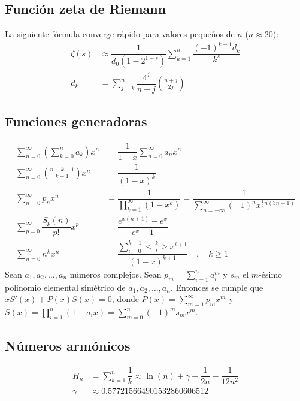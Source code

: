 \documentclass[11pt]{article}
\newcommand{\genEuler}[3]{%
	\genfrac{<}{>}{0pt}{#1}{#2}{#3}%
}
\newcommand{\euler}[2]{\genEuler{}{#1}{#2}}
\begin{document}
		\subsection{Función zeta de Riemann}
			La siguiente fórmula converge rápido para valores pequeños de $n$ ($n \approx 20$):
			\begin{align*}
				\zeta(s) &\approx \dfrac{1}{d_0 (1 - 2^{1-s})} \sum_{k=1}^{n} \dfrac{(-1)^{k-1} d_k}{k^s} \\
				d_k &= \sum_{j=k}^{n} \dfrac{4^j}{n+j} \binom{n+j}{2j}
			\end{align*}
		
		\subsection{Funciones generadoras}
			\begin{align*}
				\sum_{n=0}^{\infty} \left( \sum_{k=0}^{n}a_k \right) x^n &= \dfrac{1}{1-x}\sum_{n=0}^{\infty} a_n x^n \\
				\sum_{n=0}^{\infty} \binom{n+k-1}{k-1}x^n &= \dfrac{1}{\left(1-x\right)^k} \\
				\sum_{n=0}^{\infty} p_n x^n &= \dfrac{1}{\displaystyle \prod_{k=1}^{\infty}(1-x^k)} = \dfrac{1}{\displaystyle \sum_{n=-\infty}^{\infty} (-1)^n x^{\frac{1}{2}n(3n+1)}} \\
				\sum_{p=0}^{\infty} \dfrac{S_p(n)}{p!} x^p &= \dfrac{e^{x(n+1)}-e^x}{e^x-1} \\
				\sum_{n=0}^{\infty} n^k x^n &= \dfrac{\displaystyle \sum_{i=0}^{k-1} \euler{k}{i} x^{i+1}}{(1-x)^{k+1}} \quad , \quad k \geq 1
			\end{align*}
			Sean $a_1, a_2, \ldots, a_n$ números complejos. Sean $p_m = \displaystyle \sum_{i=1}^{n} a_i^m$ y $s_m$ el $m$-ésimo polinomio elemental simétrico de $a_1, a_2, \ldots, a_n$. Entonces se cumple que $xS'(x) + P(x)S(x) = 0$, donde $P(x)=\displaystyle \sum_{m=1}^{\infty} p_m x^m$ y $S(x)=\displaystyle \prod_{i=1}^{n}(1-a_ix) = \sum_{m=0}^{n}(-1)^m s_m x^m$.
		
		\subsection{Números armónicos}
			\begin{align*}
				H_n &= \sum_{k=1}^{n} \dfrac{1}{k} \approx \ln(n) + \gamma + \dfrac{1}{2n} - \dfrac{1}{12n^2} \\
				\gamma &\approx 0.577215664901532860606512
			\end{align*}
		
\end{document}
